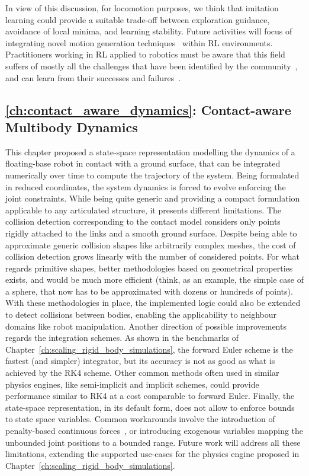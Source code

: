 In view of this discussion, for locomotion purposes, we think that imitation learning could provide a suitable trade-off between exploration guidance, avoidance of local minima, and learning stability.
Future activities will focus of integrating novel motion generation techniques~\parencite{viceconte_adherent_2022} within \ac{RL} environments.
Practitioners working in \ac{RL} applied to robotics must be aware that this field suffers of mostly all the challenges that have been identified by the community~\parencite{dulac-arnold_empirical_2021}, and can learn from their successes and failures~\parencite{ibarz_how_2021}.

\subsection*{\autoref{ch:contact_aware_dynamics}: Contact-aware Multibody Dynamics}

This chapter proposed a state-space representation modelling the dynamics of a floating-base robot in contact with a ground surface, that can be integrated numerically over time to compute the trajectory of the system.
Being formulated in reduced coordinates, the system dynamics is forced to evolve enforcing the joint constraints.
While being quite generic and providing a compact formulation applicable to any articulated structure, it presents different limitations.
The collision detection corresponding to the contact model considers only points rigidly attached to the links and a smooth ground surface.
Despite being able to approximate generic collision shapes like arbitrarily complex meshes, the cost of collision detection grows linearly with the number of considered points.
For what regards primitive shapes, better methodologies based on geometrical properties exists, and would be much more efficient (think, as an example, the simple case of a sphere, that now has to be approximated with dozens or hundreds of points).
With these methodologies in place, the implemented logic could also be extended to detect collisions between bodies, enabling the applicability to neighbour domains like robot manipulation.
Another direction of possible improvements regards the integration schemes.
As shown in the benchmarks of Chapter~\ref{ch:scaling_rigid_body_simulations}, the forward Euler scheme is the fastest (and simpler) integrator, but its accuracy is not as good as what  is achieved by the \ac{RK4} scheme.
Other common methods often used in similar physics engines, like semi-implicit and implicit schemes, could provide performance similar to \ac{RK4} at a cost comparable to forward Euler.
Finally, the state-space representation, in its default form, does not allow to enforce bounds to state space variables.
Common workarounds involve the introduction of penalty-based continuous forces~\parencite{xu_accelerated_2022}, or introducing exogenous variables mapping the unbounded joint positions to a bounded range.
Future work will address all these limitations, extending the supported use-cases for the physics engine proposed in Chapter~\ref{ch:scaling_rigid_body_simulations}.


